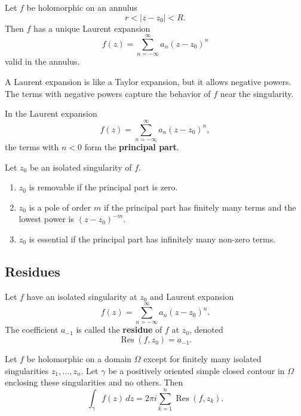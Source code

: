 \begin{theorem}
Let $f$ be holomorphic on an annulus
\[
    r<|z-z_0|<R.
\]
Then $f$ has a unique Laurent expansion
\[
    f(z)=\sum_{n=-\infty}^{\infty}a_n(z-z_0)^n
\]
valid in the annulus.
\end{theorem}

A Laurent expansion is like a Taylor expansion, but it allows negative powers. The terms with negative powers capture the behavior of $f$ near the singularity.

\begin{definition}
In the Laurent expansion
\[
    f(z)=\sum_{n=-\infty}^{\infty}a_n(z-z_0)^n,
\]
the terms with $n<0$ form the \textbf{principal part}.
\end{definition}

\begin{proposition}
Let $z_0$ be an isolated singularity of $f$.
\begin{enumerate}
    \item $z_0$ is removable if the principal part is zero.
    \item $z_0$ is a pole of order $m$ if the principal part has finitely many terms and the lowest power is $(z-z_0)^{-m}$.
    \item $z_0$ is essential if the principal part has infinitely many non-zero terms.
\end{enumerate}
\end{proposition}

\subsection{Residues}

\begin{definition}[Residue]
Let $f$ have an isolated singularity at $z_0$ and Laurent expansion
\[
    f(z)=\sum_{n=-\infty}^{\infty}a_n(z-z_0)^n.
\]
The coefficient $a_{-1}$ is called the \textbf{residue} of $f$ at $z_0$, denoted
\[
    \operatorname{Res}(f,z_0)=a_{-1}.
\]
\end{definition}

\begin{theorem}
Let $f$ be holomorphic on a domain $\Omega$ except for finitely many isolated singularities $z_1,\dots,z_n$. Let $\gamma$ be a positively oriented simple closed contour in $\Omega$ enclosing these singularities and no others. Then
\[
    \int_\gamma f(z)\,dz=2\pi i\sum_{k=1}^{n}\operatorname{Res}(f,z_k).
\]
\end{theorem}

